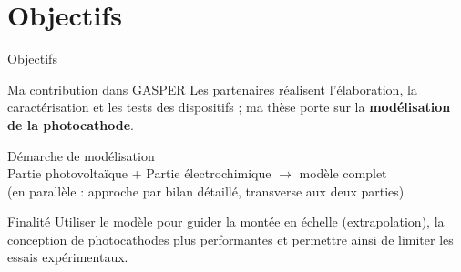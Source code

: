 \section{Objectifs}

\begin{frame}[t]{Objectifs}

  \vspace{-0.75em}

  \begin{pcbanner}{Ma contribution dans GASPER}
    \centering
    \footnotesize
      Les partenaires réalisent l'élaboration, la caractérisation et les tests des dispositifs ;
  ma thèse porte sur la \textbf{modélisation de la photocathode}.
  \end{pcbanner}

  \vspace{-0.5em}

  \begin{pcbanner}{Démarche de modélisation}
    \centering
    \figschemademarchemodelo\\[0.5em]
    \vspace{0.5em}
    \footnotesize
    \textcolor{pcNavy}{
      Partie photovoltaïque
      \hspace{1em}+\hspace{1em}
      Partie électrochimique
      \hspace{1em}$\rightarrow$\hspace{1em}
      modèle complet
    }\\
    \textcolor{pcNavy}{(en parallèle : approche par bilan détaillé, transverse aux deux parties)}

  \end{pcbanner}

  \vspace{-0.65em}

\begin{pcbanner}{Finalité}
  \centering
  \footnotesize
  Utiliser le modèle pour guider la montée en échelle (extrapolation), la conception de photocathodes
  plus performantes et permettre ainsi de limiter les essais expérimentaux.
  
\end{pcbanner}

\end{frame}

